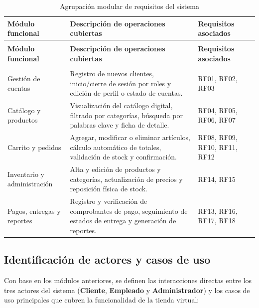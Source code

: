 {\small
\begin{xltabular}{\textwidth}{|>{\raggedright\arraybackslash}p{3.4cm}|X|>{\raggedright\arraybackslash}p{3.0cm}|}
    \caption{Agrupación modular de requisitos del sistema}
    \label{tab:analisis_requisitos} \\
    \hline
    \textbf{Módulo funcional} & \textbf{Descripción de operaciones cubiertas} & \textbf{Requisitos asociados} \\
    \hline
    \endfirsthead

     \\
    \hline
    \textbf{Módulo funcional} & \textbf{Descripción de operaciones cubiertas} & \textbf{Requisitos asociados} \\
    \hline
    \endhead

     \\
    \endfoot

    \endlastfoot

    Gestión de cuentas & Registro de nuevos clientes, inicio/cierre de sesión por roles y edición de perfil o estado de cuentas. & RF01, RF02, RF03 \\*
    \hline
    Catálogo y productos & Visualización del catálogo digital, filtrado por categorías, búsqueda por palabras clave y ficha de detalle. & RF04, RF05, RF06, RF07 \\*
    \hline
    Carrito y pedidos & Agregar, modificar o eliminar artículos, cálculo automático de totales, validación de stock y confirmación. & RF08, RF09, RF10, RF11, RF12 \\*
    \hline
    Inventario y administración & Alta y edición de productos y categorías, actualización de precios y reposición física de stock. & RF14, RF15 \\*
    \hline
    Pagos, entregas y reportes & Registro y verificación de comprobantes de pago, seguimiento de estados de entrega y generación de reportes. & RF13, RF16, RF17, RF18 \\
    \hline
\end{xltabular}
}

\subsection{Identificación de actores y casos de uso}
Con base en los módulos anteriores, se definen las interacciones directas entre los tres actores del sistema (\textbf{Cliente}, \textbf{Empleado} y \textbf{Administrador}) y los casos de uso principales que cubren la funcionalidad de la tienda virtual:

